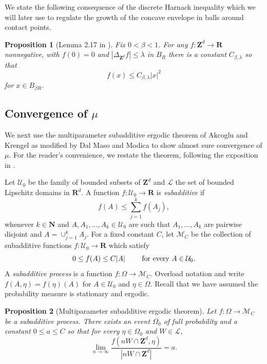 \documentclass[12pt]{amsart}
\newcommand{\R}{\mathbf{R}}
\newcommand{\Z}{\mathbf{Z}}
\newcommand{\N}{\mathbf{N}}
\newtheorem{prop}{Proposition}[section]
\begin{document}
We state the following consequence of the discrete Harnack inequality \cite{lawler2010random} which we will later use to regulate the growth of the concave envelope in balls around contact points. 

\begin{prop}[Lemma 2.17 in \cite{levine2010scaling}] \label{harnack}
Fix $0 < \beta < 1$. For any $f: \Z^d \to \R$ nonnegative, with $f(0) = 0$ and $|\Delta_{\Z^d} f| \leq \lambda$ in $B_R$  there is a constant $C_{\beta,\lambda}$ so that
\begin{equation} \label{harnack_eq}
f(x) \leq C_{\beta,\lambda}  |x|^2
\end{equation}
for $x \in B_{\beta R}$.
\end{prop}


\subsection{Convergence of $\mu$}


We next use the multiparameter subadditive ergodic theorem of Akcoglu and Krengel \cite{akcoglu1981ergodic}
as modified by Dal Maso and Modica \cite{dal1985nonlinear} to show almost sure convergence of $\mu$. 
For the reader's convenience, we restate the theorem, following 
the exposition in \cite{armstrong2014regularity}. 

Let $\mathcal{U}_0$ be the family of bounded subsets of $\Z^d$ and $\mathcal{L}$ the set 
of bounded Lipschitz domains in $\R^d$. A function $f: \mathcal{U}_0 \to \R$ 
is {\it subadditive} if 
\[
f(A) \leq \sum_{j=1}^{k} f(A_j), 
\]
whenever $k \in \N$ and $A, A_1, \ldots, A_k \in \mathcal{U}_0$ are such that $A_1, \ldots, A_k$ are pairwise disjoint and $A = \cup_{j=1}^k A_j$. For a fixed constant $C$, let $\mathcal{M}_C$
be the collection of subadditive functions $f: \mathcal{U}_0 \to \R$ which satisfy 
\[
0 \leq f(A) \leq C |A| \mbox { \qquad for every $A \in \mathcal{U}_0$}.
\]
A {\it subadditive process} is a function $f: \Omega \to \mathcal{M}_C$. Overload notation and write 
$f(A, \eta) = f(\eta)(A)$ for $A \in \mathcal{U}_0$ and $\eta \in \Omega$. Recall that we have assumed the probability measure is stationary and ergodic. 



\begin{prop}[Multiparameter subadditive ergodic theorem] \label{prop:subadditive}
	Let $f: \Omega \to \mathcal{M}_C$ be a subadditive process. There exists
	an event $\Omega_0$ of full probability and a constant $0 \leq a \leq C$ so
	that for every $\eta \in \Omega_0$ and $W \in \mathcal{L}$, 
	\begin{equation}
	\lim_{n \to \infty} \frac{f(n W \cap \Z^d, \eta)}{|n W \cap \Z^d|} = a. 
	\end{equation}
	
\end{prop}
\end{document}
